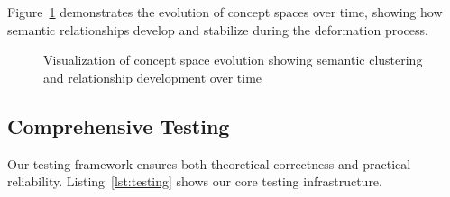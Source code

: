 \documentclass{article}
\begin{document}
Figure~\ref{fig:concept-evolution} demonstrates the evolution of concept spaces over time, showing how semantic relationships develop and stabilize during the deformation process.

\begin{figure}[htbp]
\centering
{}
\caption{Visualization of concept space evolution showing semantic clustering and relationship development over time}
\label{fig:concept-evolution}
\end{figure}

\subsection{Comprehensive Testing}
Our testing framework ensures both theoretical correctness and practical reliability. Listing~\ref{lst:testing} shows our core testing infrastructure.
\end{document}
